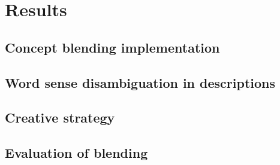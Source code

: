 
\chapter{Results} %

\label{Chapter6} %


\section{Concept blending implementation}


\section{Word sense disambiguation in descriptions}


\section{Creative strategy}


\section{Evaluation of blending}

